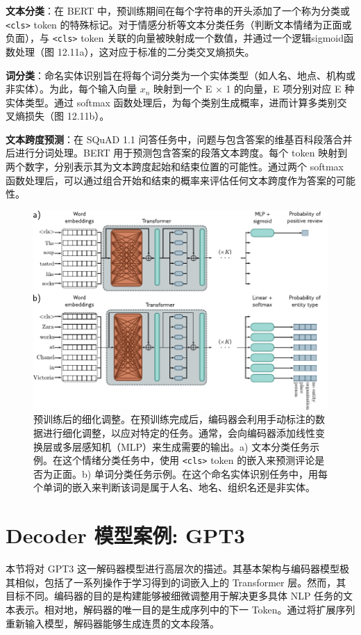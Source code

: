 \documentclass[lang=cn,newtx,10pt,scheme=chinese]{elegantbook}
\begin{document}
\textbf{文本分类}：在 BERT 中，预训练期间在每个字符串的开头添加了一个称为分类或 \texttt{\textless cls\textgreater} token 的特殊标记。对于情感分析等文本分类任务（判断文本情绪为正面或负面），与 \texttt{\textless cls\textgreater} token 关联的向量被映射成一个数值，并通过一个逻辑sigmoid函数处理（图 12.11a），这对应于标准的二分类交叉熵损失。

\textbf{词分类}：命名实体识别旨在将每个词分类为一个实体类型（如人名、地点、机构或非实体）。为此，每个输入向量 \(x_n\) 映射到一个 E × 1 的向量，E 项分别对应 E 种实体类型。通过 softmax 函数处理后，为每个类别生成概率，进而计算多类别交叉熵损失（图 12.11b）。

\textbf{文本跨度预测}：在 SQuAD 1.1 问答任务中，问题与包含答案的维基百科段落合并后进行分词处理。BERT 用于预测包含答案的段落文本跨度。每个 token 映射到两个数字，分别表示其为文本跨度起始和结束位置的可能性。通过两个 softmax 函数处理后，可以通过组合开始和结束的概率来评估任何文本跨度作为答案的可能性。

\begin{figure}[ht!]
\centering
\includegraphics[width=0.7\linewidth]{PDFFigures/UDLChap12PDF/TransformerEncoderFineTune.pdf}
\caption{预训练后的细化调整。在预训练完成后，编码器会利用手动标注的数据进行细化调整，以应对特定的任务。通常，会向编码器添加线性变换层或多层感知机（MLP）来生成需要的输出。a) 文本分类任务示例。在这个情绪分类任务中，使用 \texttt{\textless cls\textgreater} token 的嵌入来预测评论是否为正面。b) 单词分类任务示例。在这个命名实体识别任务中，用每个单词的嵌入来判断该词是属于人名、地名、组织名还是非实体。}
\end{figure}


\section{Decoder 模型案例: GPT3}
本节将对 GPT3 这一解码器模型进行高层次的描述。其基本架构与编码器模型极其相似，包括了一系列操作于学习得到的词嵌入上的 Transformer 层。然而，其目标不同。编码器的目的是构建能够被细微调整用于解决更多具体 NLP 任务的文本表示。相对地，解码器的唯一目的是生成序列中的下一 Token。通过将扩展序列重新输入模型，解码器能够生成连贯的文本段落。
\end{document}
